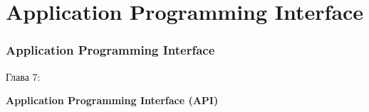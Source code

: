 %

\section{Application Programming Interface}
\begin{frame}[fragile]
	\frametitle{Application Programming Interface}

	\begin{center}\huge{Глава 7:}\end{center}
	\begin{center}\huge{\color{typo3darkgrey}\textbf{Application Programming Interface (API)}}\end{center}

\end{frame}


